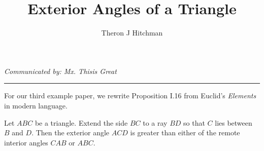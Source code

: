 \documentclass[12pt]{article}
\newenvironment{theorem}[1][Theorem]{\begin{trivlist}
\item[\hskip \labelsep {\bfseries #1}]}{\end{trivlist}}
\begin{document}
 
 
\title{Exterior Angles of a Triangle} %
\author{Theron J Hitchman} %
 
\maketitle

{%
\centering
\textit{Communicated by: Mx. Thisis Great} %
\par
}
\hrule
\vspace{.2in}


For our third example paper, we rewrite Proposition I.16 from Euclid's \emph{Elements} in modern language.

\begin{theorem}[Euclid's Proposition I.16] Let $ABC$ be a triangle. Extend the side $BC$ to a ray $BD$ so that $C$ lies between $B$ and $D$. Then the exterior angle $ACD$ is greater than either of the remote interior angles $CAB$ or $ABC$.
\end{theorem}
 
\end{document}
